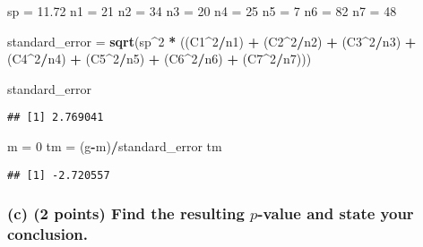 \documentclass[]{article}
\newenvironment{Shaded}{\begin{snugshade}}{\end{snugshade}}
\newcommand{\KeywordTok}[1]{\textcolor[rgb]{0.13,0.29,0.53}{\textbf{#1}}}
\newcommand{\DecValTok}[1]{\textcolor[rgb]{0.00,0.00,0.81}{#1}}
\newcommand{\FloatTok}[1]{\textcolor[rgb]{0.00,0.00,0.81}{#1}}
\newcommand{\StringTok}[1]{\textcolor[rgb]{0.31,0.60,0.02}{#1}}
\newcommand{\OperatorTok}[1]{\textcolor[rgb]{0.81,0.36,0.00}{\textbf{#1}}}
\newcommand{\NormalTok}[1]{#1}
\begin{document}
\begin{Shaded}
\begin{Highlighting}[]
\NormalTok{sp =}\StringTok{ }\FloatTok{11.72}
\NormalTok{n1 =}\StringTok{ }\DecValTok{21}
\NormalTok{n2 =}\StringTok{ }\DecValTok{34}
\NormalTok{n3 =}\StringTok{ }\DecValTok{20}
\NormalTok{n4 =}\StringTok{ }\DecValTok{25}
\NormalTok{n5 =}\StringTok{ }\DecValTok{7}
\NormalTok{n6 =}\StringTok{ }\DecValTok{82}
\NormalTok{n7 =}\StringTok{ }\DecValTok{48}

\NormalTok{standard_error =}\StringTok{ }\KeywordTok{sqrt}\NormalTok{(sp}\OperatorTok{^}\DecValTok{2} \OperatorTok{*}\StringTok{ }\NormalTok{((C1}\OperatorTok{^}\DecValTok{2}\OperatorTok{/}\NormalTok{n1) }\OperatorTok{+}\StringTok{ }\NormalTok{(C2}\OperatorTok{^}\DecValTok{2}\OperatorTok{/}\NormalTok{n2) }\OperatorTok{+}\StringTok{ }\NormalTok{(C3}\OperatorTok{^}\DecValTok{2}\OperatorTok{/}\NormalTok{n3) }\OperatorTok{+}\StringTok{ }\NormalTok{(C4}\OperatorTok{^}\DecValTok{2}\OperatorTok{/}\NormalTok{n4) }\OperatorTok{+}\StringTok{ }\NormalTok{(C5}\OperatorTok{^}\DecValTok{2}\OperatorTok{/}\NormalTok{n5) }\OperatorTok{+}\StringTok{ }\NormalTok{(C6}\OperatorTok{^}\DecValTok{2}\OperatorTok{/}\NormalTok{n6) }\OperatorTok{+}\StringTok{ }\NormalTok{(C7}\OperatorTok{^}\DecValTok{2}\OperatorTok{/}\NormalTok{n7)))}

\NormalTok{standard_error}
\end{Highlighting}
\end{Shaded}

\begin{verbatim}
## [1] 2.769041
\end{verbatim}

\begin{Shaded}
\begin{Highlighting}[]
\NormalTok{m =}\StringTok{ }\DecValTok{0}
\NormalTok{tm =}\StringTok{ }\NormalTok{(g}\OperatorTok{-}\NormalTok{m)}\OperatorTok{/}\NormalTok{standard_error}
\NormalTok{tm}
\end{Highlighting}
\end{Shaded}

\begin{verbatim}
## [1] -2.720557
\end{verbatim}

\subsubsection{\texorpdfstring{(c) (2 points) Find the resulting
\(p\)-value and state your
conclusion.}{(c) (2 points) Find the resulting p-value and state your conclusion.}}\label{c-2-points-find-the-resulting-p-value-and-state-your-conclusion.}
\end{document}

